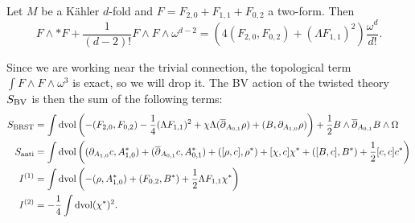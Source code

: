 \documentclass[10pt, oneside]{article}
\begin{document}
\begin{corollary} \label{Kahler_YM_term_cor}
Let $M$ be a K\"{a}hler $d$-fold and $F = F_{2, 0} + F_{1, 1} + F_{0, 2}$ a two-form. Then
\[F\wedge \ast F + \frac{1}{(d-2)!} F\wedge F\wedge \omega^{d-2} = \left(4(F_{2, 0}, F_{0, 2}) + (\Lambda F_{1, 1})^2\right) \frac{\omega^d}{d!}.\]
\end{corollary}

Since we are working near the trivial connection, the topological term $\int F\wedge F\wedge \omega^3$ is exact, so we will drop it. The BV action of the twisted theory $S_{\mathrm{BV}}$ is then the sum of the following terms:
\begin{align}
S_{\mathrm{BRST}} &= \int \operatorname{dvol} \left(-(F_{2, 0}, F_{0, 2}) - \frac{1}{4}(\Lambda F_{1, 1})^2 + \chi \Lambda(\overline{\partial}_{A_{0, 1}}\rho) + (B, \partial_{A_{1, 0}} \rho)\right)  + \frac{1}{2}B\wedge \overline{\partial}_{A_{0, 1}} B\wedge\Omega \label{eq:10dBRST} \\
S_{\mathrm{anti}} &= \int \operatorname{dvol}\left((\partial_{A_{1, 0}} c, A_{1, 0}^*) + (\overline{\partial}_{A_{0, 1}} c, A_{0, 1}^*) + ([\rho, c], \rho^*) + [\chi, c]\chi^* + ([B, c], B^*) + \frac{1}{2}[c, c]c^*\right) \label{eq:10danti} \\
I^{(1)} &= \int \operatorname{dvol}\left(-(\rho, A_{1, 0}^*) + (F_{0, 2}, B^*) + \frac{1}{2}\Lambda F_{1, 1} \chi^*\right) \\
I^{(2)} &= -\frac{1}{4}\int \operatorname{dvol} (\chi^*)^2.
\end{align}
\end{document}
